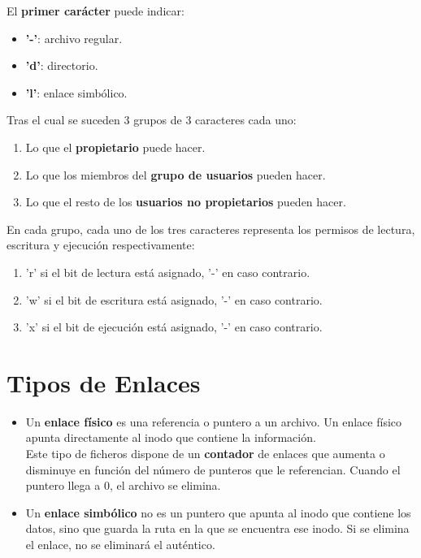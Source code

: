 El \textbf{primer carácter} puede indicar:
\begin{itemize}
    \item \textbf{'-'}: archivo regular.
    \item \textbf{'d'}:	directorio.
    \item \textbf{'l'}:	enlace simbólico.
\end{itemize}
Tras el cual se suceden 3 grupos de 3 caracteres cada uno:
\begin{enumerate}
    \item Lo que el \textbf{propietario} puede hacer.
    \item Lo que los miembros del \textbf{grupo de usuarios} pueden hacer.
    \item Lo que el resto de los \textbf{usuarios no propietarios} pueden hacer.
\end{enumerate}
En cada grupo, cada uno de los tres caracteres representa los permisos de lectura, escritura y ejecución respectivamente:
\begin{enumerate}
    \item 'r' si el bit de lectura está asignado, '-' en caso contrario.
    \item 'w' si el bit de escritura está asignado, '-' en caso contrario.
    \item 'x' si el bit de ejecución está asignado, '-' en caso contrario.
\end{enumerate}

\section{Tipos de Enlaces}
\begin{itemize}
    \item Un \textbf{enlace físico} es una referencia o puntero a un archivo. Un enlace físico apunta directamente al inodo que contiene la información.\\
    
    Este tipo de ficheros dispone de un \textbf{contador} de enlaces que aumenta o disminuye en función del número de punteros que le referencian. Cuando el puntero llega a 0, el archivo se elimina.
    
    \item Un \textbf{enlace simbólico} no es un puntero que apunta al inodo que contiene los datos, sino que guarda la ruta en la que se encuentra ese inodo. Si se elimina el enlace, no se eliminará el auténtico.
\end{itemize}

